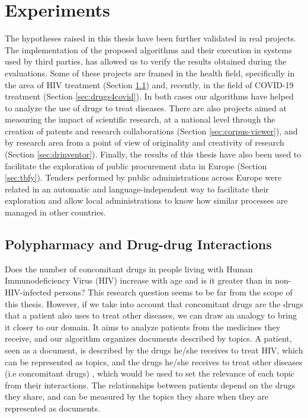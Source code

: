 

\chapter{Experiments}\label{ch:experiments}

\graphicspath{{experiments/figures/}}


The hypotheses raised in this thesis have been further validated in real projects. The implementation of the proposed algorithms and their execution in systems used by third parties, has allowed us to verify the results obtained during the evaluations. Some of these projects are framed in the health field, specifically in the area of HIV treatment (Section \ref{sec:polypharmacy}) and, recently, in the field of COVID-19 treatment (Section \ref{sec:drugs4covid}). In both cases our algorithms have helped to analyze the use of drugs to treat diseases. There are also projects aimed at measuring the impact of scientific research, at a national level through the creation of patents and research collaborations (Section \ref{sec:corpus-viewer}), and by research area from a point of view of originality and creativity of research (Section \ref{sec:drinventor}). Finally, the results of this thesis have also been used to facilitate the exploration of public procurement data in Europe (Section \ref{sec:tbfy}). Tenders performed by public administrations across Europe were related in an automatic and language-independent way to facilitate their exploration and allow local administrations to know how similar processes are managed in other countries.  


\section{Polypharmacy and Drug-drug Interactions}
\label{sec:polypharmacy}

Does the number of concomitant drugs in people living with Human Immunodeficiency Virus (HIV) increase with age and is it greater than in non-HIV-infected persons? This research question \citep{Badenes-Olmedo2019c} seems to be far from the scope of this thesis. However, if we take into account that  concomitant drugs are the drugs that a patient also uses to treat other diseases, we can draw an analogy to bring it closer to our domain. It aims to analyze patients from the medicines they receive, and our algorithm organizes documents described by topics. A patient, seen as a document, is described by the drugs he/she receives to treat HIV, which can be represented as topics, and the drugs he/she receives to treat other diseases (i.e concomitant drugs) , which would be used to set the relevance of each topic from their interactions. The relationships between patients depend on the drugs they share, and can be measured by the topics they share when they are represented as documents.


